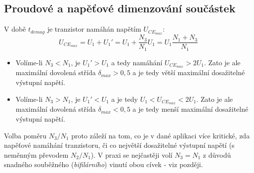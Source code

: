   \subsection{Proudové a napěťové dimenzování součástek}
    V době $t_{demag}$ je tranzistor namáhán napětím $U_{{CE}_{max}}$:
    \begin{equation}\label{ENZ:eq_dim_Ucemax}
      U_{{CE}_{max}} = U_1 + U_1' = U_1 + \frac{N_3}{N_1}U_1 = U_1\frac{N_1+N_3}{N_1}
    \end{equation}
    \begin{itemize}[noitemsep]
     \item Volíme-li $N_3 < N_1$, je $U_1' > U_1$ a tedy namáhání $U_{{CE}_{max}} > 2U_1$. Zato
           je ale maximální dovolená střída $\delta_{max} > 0,5$ a je tedy větší maximální
           dosažitelné výstupní napětí.
     \item Volíme-li $N_3 > N_1$, je $U_1' < U_1$ a je tedy  $U_1 < U_{{CE}_{max}} < 2U_1$. Zato
           je ale maximální dovolená střída $\delta_{max} < 0,5$ a je tedy menší maximální
           dosažitelné výstupní napětí.
    \end{itemize}
    Volba  poměru  $N_3/N_1$ proto záleží na tom, co je v dané aplikaci více kritické, zda
    napěťové namáhání tranzistoru,  či co největší dosažitelné výstupní napětí (s neměnným
    převodem  $N_2/N_1$). V praxi se nejčastěji volí $N_3 = N_1$ z důvodů snadného souběžného
    (\emph{bifilárního}) vinutí obou cívek - viz později.
    
